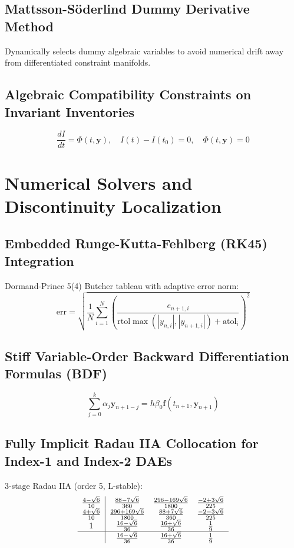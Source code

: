 \documentclass[11pt,a4paper]{article}
\begin{document}
\subsection{Mattsson-S\"oderlind Dummy Derivative Method}
Dynamically selects dummy algebraic variables to avoid numerical drift away from differentiated constraint manifolds.

\subsection{Algebraic Compatibility Constraints on Invariant Inventories}
\begin{equation}
\frac{dI}{dt} = \Phi(t, \mathbf{y}), \quad I(t) - I(t_0) = 0, \quad \Phi(t, \mathbf{y}) = 0
\end{equation}

\section{Numerical Solvers and Discontinuity Localization}

\subsection{Embedded Runge-Kutta-Fehlberg (RK45) Integration}
Dormand-Prince 5(4) Butcher tableau with adaptive error norm:
\begin{equation}
\text{err} = \sqrt{\frac{1}{N} \sum_{i=1}^N \left( \frac{e_{n+1, i}}{\text{rtol} \max(|y_{n, i}|, |y_{n+1, i}|) + \text{atol}_i} \right)^2}
\end{equation}

\subsection{Stiff Variable-Order Backward Differentiation Formulas (BDF)}
\begin{equation}
\sum_{j=0}^k \alpha_j \mathbf{y}_{n+1-j} = h \beta_0 \mathbf{f}(t_{n+1}, \mathbf{y}_{n+1})
\end{equation}

\subsection{Fully Implicit Radau IIA Collocation for Index-1 and Index-2 DAEs}
3-stage Radau IIA (order 5, L-stable):
\begin{equation}
\begin{array}{c|ccc}
\frac{4 - \sqrt{6}}{10} & \frac{88 - 7\sqrt{6}}{360} & \frac{296 - 169\sqrt{6}}{1800} & \frac{-2 + 3\sqrt{6}}{225} \\
\frac{4 + \sqrt{6}}{10} & \frac{296 + 169\sqrt{6}}{1800} & \frac{88 + 7\sqrt{6}}{360} & \frac{-2 - 3\sqrt{6}}{225} \\
1 & \frac{16 - \sqrt{6}}{36} & \frac{16 + \sqrt{6}}{36} & \frac{1}{9} \\
\hline
& \frac{16 - \sqrt{6}}{36} & \frac{16 + \sqrt{6}}{36} & \frac{1}{9}
\end{array}
\end{equation}
\end{document}
